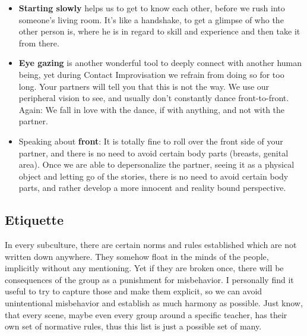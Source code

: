 \begin{itemize}
    \item \textbf{Starting slowly} helps us to get to know each other, before we rush into someone's living room.
    It's like a handshake, to get a glimpse of who the other person is, where he is in regard to skill and experience and then take it from there.
    \item \textbf{Eye gazing} is another wonderful tool to deeply connect with another human being, yet during Contact Improvisation we refrain from doing so for too long.
     Your partners will tell you that this is not the way.
     We use our peripheral vision to see, and usually don't constantly dance front-to-front.
     Again: We fall in love with the dance, if with anything, and not with the partner.
    \item Speaking about \textbf{front}: It is totally fine to roll over the front side of your partner, and there is no need to avoid certain body parts (breasts, genital area).
    Once we are able to depersonalize the partner, seeing it as a physical object and letting go of the stories, there is no need to avoid certain body parts, and rather develop a more innocent and reality bound perspective.
\end{itemize}

\subsection{Etiquette}\label{subsec:etiquette}

In every subculture, there are certain norms and rules established which are not written down anywhere.
They somehow float in the minds of the people, implicitly without any mentioning.
Yet if they are broken once, there will be consequences of the group as a punishment for misbehavior.
I personally find it useful to try to capture those and make them explicit, so we can avoid unintentional misbehavior and establish as much harmony as possible.
Just know, that every scene, maybe even every group around a specific teacher, has their own set of normative rules, thus this list is just a possible set of many.

